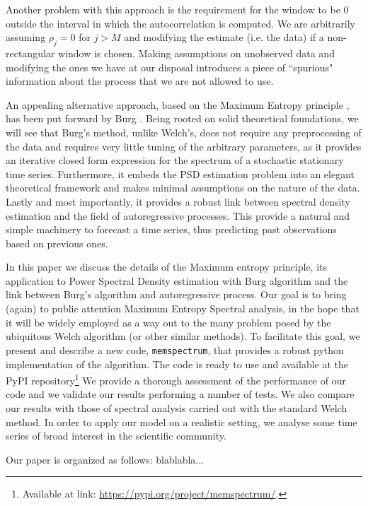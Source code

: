 \documentclass[twocolumn,showpacs,preprintnumbers,nofootinbib,prd,
superscriptaddress,10pt]{revtex4-1}
\begin{document}
Another problem with this approach is the requirement for the window to be $0$ outside the interval in which the autocorrelation is computed.
We are arbitrarily assuming $\rho_j = 0$ for $j > M$ and modifying the estimate (i.e. the data) if a non-rectangular window is chosen.
Making assumptions on unobserved data and modifying the ones we have at our disposal introduces a piece of ``spurious" information about the process that we are not allowed to use.

An appealing alternative approach, based on the Maximum Entropy principle \cite{JaynesArticle,jaynes2003ptl}, has been put forward by Burg \cite{burg1975maximum}. Being rooted on solid theoretical foundations, we will see that Burg's method, unlike Welch's, does not require any preprocessing of the data and requires very little tuning of the arbitrary parameters, as it provides an iterative closed form expression for the spectrum of a stochastic stationary time series. Furthermore, it embeds the PSD estimation problem into an elegant theoretical framework and makes minimal assumptions on the nature of the data.
Lastly and most importantly, it provides a robust link between spectral density estimation and the field of autoregressive processes. This provide a natural and simple machinery to forecast a time series, thus predicting past observations based on previous ones.

In this paper we discuss the details of the Maximum entropy principle, its application to Power Spectral Density estimation with Burg algorithm and the link between Burg's algorithm and autoregressive process.
Our goal is to bring (again) to public attention Maximum Entropy Spectral analysis, in the hope that it will be widely employed as a way out to the many problem posed by the ubiquitous Welch algorithm (or other similar methods).
To facilitate this goal, we present and describe a new code, \texttt{memspectrum}, that provides a robust python implementation of the algorithm. The code is ready to use and available at the PyPI repository\footnote{
Available at link: \url{https://pypi.org/project/memspectrum/}.
}
We provide a thorough assessment of the performance of our code and we validate our results performing a number of tests. We also compare our results with those of spectral analysis carried out with the standard Welch method.
In order to apply our model on a realistic setting, we analyse some time series of broad interest in the scientific community.

Our paper is organized as follows: blablabla...
\end{document}
